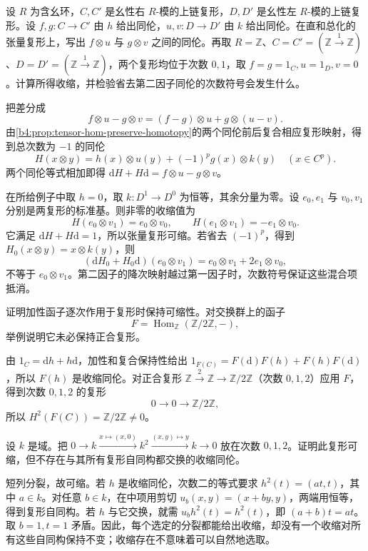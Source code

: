 \begin{exercise}\label{b4:ex:06-tensor-homotopy}
	设 \(R\) 为含幺环，\(C,C'\) 是幺性右 \(R\)-模的上链复形，\(D,D'\) 是幺性左 \(R\)-模的上链复形。设 \(f,g:C\to C'\) 由 \(h\) 给出同伦，\(u,v:D\to D'\) 由 \(k\) 给出同伦。在直和总化的张量复形上，写出 \(f\otimes u\) 与 \(g\otimes v\) 之间的同伦。再取 \(R=\mathbb Z\)、\(C=C'=(\mathbb Z\xrightarrow1\mathbb Z)\)、\(D=D'=(\mathbb Z\xrightarrow1\mathbb Z)\)，两个复形均位于次数 \(0,1\)，取 \(f=g=1_C,u=1_D,v=0\)。计算所得收缩，并检验省去第二因子同伦的次数符号会发生什么。
\end{exercise}
\begin{solution}
	把差分成
	\[
		f\otimes u-g\otimes v=(f-g)\otimes u+g\otimes(u-v).
	\]
	由\cref{b4:prop:tensor-hom-preserve-homotopy}的两个同伦前后复合相应复形映射，得到总次数为 \(-1\) 的同伦
	\[
		H(x\otimes y)=h(x)\otimes u(y)+(-1)^p g(x)\otimes k(y) \quad(x\in C^p).
	\]
	两个同伦等式相加即得 \(\mathrm{d}H+H\mathrm{d}=f\otimes u-g\otimes v\)。

	在所给例子中取 \(h=0\)，取 \(k:D^1\to D^0\) 为恒等，其余分量为零。设 \(e_0,e_1\) 与 \(v_0,v_1\) 分别是两复形的标准基。则非零的收缩值为
	\[
		H(e_0\otimes v_1)=e_0\otimes v_0,\qquad H(e_1\otimes v_1)=-e_1\otimes v_0.
	\]
	它满足 \(\mathrm{d}H+H\mathrm{d}=1\)，所以张量复形可缩。若省去 \((-1)^p\)，得到 \(H_0(x\otimes y)=x\otimes k(y)\)，则
	\[
		(\mathrm{d}H_0+H_0\mathrm{d})(e_0\otimes v_1) =e_0\otimes v_1+2e_1\otimes v_0,
	\]
	不等于 \(e_0\otimes v_1\)。第二因子的降次映射越过第一因子时，次数符号保证这些混合项抵消。
\end{solution}

\begin{exercise}\label{b4:ex:06-additive-contractibility}
	证明加性函子逐次作用于复形时保持可缩性。对交换群上的函子
	\[
		F=\operatorname{Hom}_{\mathbb Z}(\mathbb Z/2\mathbb Z,-),
	\]
	举例说明它未必保持正合复形。
\end{exercise}
\begin{solution}
	由 \(1_C=\mathrm{d}h+h\mathrm{d}\)，加性和复合保持性给出 \(1_{F(C)}=F(\mathrm{d})F(h)+F(h)F(\mathrm{d})\)，所以 \(F(h)\) 是收缩同伦。对正合复形 \(\mathbb Z\xrightarrow2\mathbb Z\to\mathbb Z/2\mathbb Z\)（次数 \(0,1,2\)）应用 \(F\)，得到次数 \(0,1,2\) 的复形
	\[
		0\longrightarrow0\longrightarrow\mathbb Z/2\mathbb Z,
	\]
	所以 \(H^2(F(C))=\mathbb Z/2\mathbb Z\ne0\)。
\end{solution}

\begin{exercise}\label{b4:ex:06-no-natural-contraction}
	设 \(k\) 是域。把 \(0\to k\xrightarrow{x\mapsto(x,0)}k^2\xrightarrow{(x,y)\mapsto y}k\to0\) 放在次数 \(0,1,2\)。证明此复形可缩，但不存在与其所有复形自同构都交换的收缩同伦。
\end{exercise}
\begin{solution}
	短列分裂，故可缩。若 \(h\) 是收缩同伦，次数二的等式要求 \(h^2(t)=(at,t)\)，其中 \(a\in k\)。对任意 \(b\in k\)，在中项用剪切 \(u_b(x,y)=(x+by,y)\)，两端用恒等，得到复形自同构。若 \(h\) 与它交换，就需 \(u_bh^2(t)=h^2(t)\)，即 \((a+b)t=at\)。取 \(b=1,t=1\) 矛盾。因此，每个选定的分裂都能给出收缩，却没有一个收缩对所有这些自同构保持不变；收缩存在不意味着可以自然地选取。
\end{solution}

